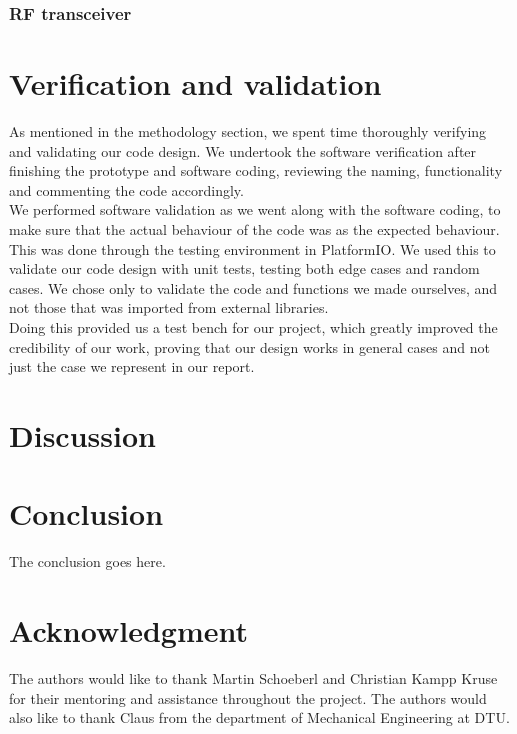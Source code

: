 \documentclass[conference]{IEEEtran}
\begin{document}
\subsubsection{RF transceiver}

\section{Verification and validation} %
As mentioned in the methodology section, we spent time thoroughly verifying and validating our code design. We undertook the software verification after finishing the prototype and software coding, reviewing the naming, functionality and commenting the code accordingly.\\
We performed software validation as we went along with the software coding, to make sure that the actual behaviour of the code was as the expected behaviour. This was done through the testing environment in PlatformIO. We used this to validate our code design with unit tests, testing both edge cases and random cases. We chose only to validate the code and functions we made ourselves, and not those that was imported from external libraries.\\
Doing this provided us a test bench for our project, which greatly improved the credibility of our work, proving that our design works in general cases and not just the case we represent in our report.

\section{Discussion}

\section{Conclusion}
The conclusion goes here.


\section*{Acknowledgment}


The authors would like to thank Martin Schoeberl and Christian Kampp Kruse for their mentoring and assistance throughout the project. The authors would also like to thank Claus from the department of Mechanical Engineering at DTU.



\end{document}
